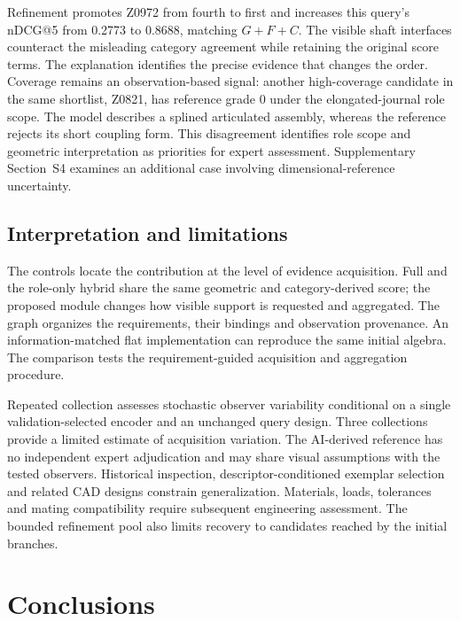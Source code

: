 \documentclass[10pt,a4paper,twocolumn]{article}
\begin{document}
Refinement promotes Z0972 from fourth to first and increases this query's nDCG@5 from 0.2773 to 0.8688, matching $G+F+C$. The visible shaft interfaces counteract the misleading category agreement while retaining the original score terms. The explanation identifies the precise evidence that changes the order. Coverage remains an observation-based signal: another high-coverage candidate in the same shortlist, Z0821, has reference grade 0 under the elongated-journal role scope. The model describes a splined articulated assembly, whereas the reference rejects its short coupling form. This disagreement identifies role scope and geometric interpretation as priorities for expert assessment. Supplementary Section~S4 examines an additional case involving dimensional-reference uncertainty.

\subsection{Interpretation and limitations}

The controls locate the contribution at the level of evidence acquisition.
Full and the role-only hybrid share the same geometric and category-derived score;
the proposed module changes how visible support is requested and aggregated.
The graph organizes the requirements, their bindings and observation provenance.
An information-matched flat implementation can reproduce the same initial algebra.
The comparison tests the requirement-guided acquisition and aggregation procedure.

Repeated collection assesses stochastic observer variability conditional on a
single validation-selected encoder and an unchanged query design. Three collections provide a limited estimate of acquisition variation. The AI-derived reference has no
independent expert adjudication and may share visual assumptions with the tested
observers. Historical inspection, descriptor-conditioned exemplar selection and
related CAD designs constrain generalization. Materials, loads, tolerances and
mating compatibility require subsequent engineering assessment. The bounded
refinement pool also limits recovery to candidates reached by the initial branches.


\section{Conclusions}
\end{document}
